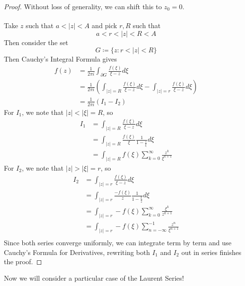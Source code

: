 \documentclass{article}
\begin{document}
\begin{proof}
Without loss of generality, we can shift this to $z_0 = 0$.\\\\
Take $z$ such that $a < |z| < A$ and pick $r, R$ such that
\[a < r < |z| < R < A\]
Then consider the set
\[G \coloneqq \{z: r < |z| < R \}\]
Then Cauchy's Integral Formula gives
\begin{align*}
    f(z) &= \frac{1}{2\pi i} \int_{\partial G} \frac{f(\xi)}{\xi - z} d\xi\\
    &= \frac{1}{2\pi i} (\int_{|z| = R} \frac{f(\xi)}{\xi - z} d\xi - \int_{|z| = r} \frac{f(\xi)}{\xi - z} d\xi)\\
    &= \frac{1}{2\pi i} (I_1 - I_2)
\end{align*}
For $I_1$, we note that $|z| < |\xi| = R$, so
\begin{align*}
    I_1 &= \int_{|z| = R} \frac{f(\xi)}{\xi - z} d\xi\\
    &= \int_{|z| = R} \frac{f(\xi)}{\xi} \frac{1}{1 - \frac{z}{\xi}} d\xi\\
    &= \int_{|z| = R} f(\xi) \sum_{k = 0}^\infty \frac{z^k}{\xi^{k+1}}
\end{align*}
For $I_2$, we note that $|z| > |\xi| = r$, so
\begin{align*}
    I_2 &= \int_{|z| = r} \frac{f(\xi)}{\xi - z} d\xi\\
    &= \int_{|z| = r} \frac{-f(\xi)}{z} \frac{1}{1 - \frac{\xi}{z}} d\xi\\
    &= \int_{|z| = r} -f(\xi) \sum_{k = 0}^\infty \frac{\xi^k}{z^{k+1}}\\
    &= \int_{|z| = r} -f(\xi) \sum_{n = -\infty}^{-1} \frac{z^n}{\xi^{n+1}}\\ \tag*{Change of Variables}
\end{align*}
Since both series converge uniformly, we can integrate term by term and use Cauchy's Formula for Derivatives, rewriting both $I_1$ and $I_2$ out in series finishes the proof.
\end{proof}

Now we will consider a particular case of the Laurent Series!
\end{document}

